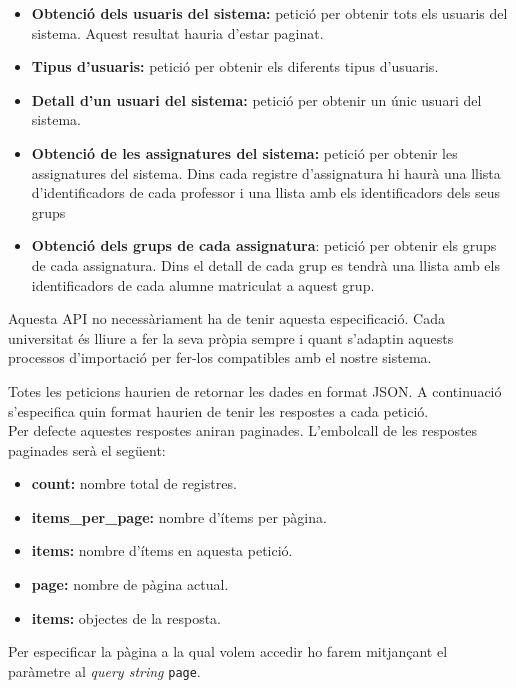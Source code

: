 	\begin{itemize} 
		\item \textbf{Obtenció dels usuaris del sistema:} petició per obtenir tots els usuaris del sistema. Aquest resultat hauria d'estar paginat.
		\item \textbf{Tipus d'usuaris:} petició per obtenir els diferents tipus d'usuaris.
		\item \textbf{Detall d'un usuari del sistema:} petició per obtenir un únic usuari del sistema.
		\item \textbf{Obtenció de les assignatures del sistema:} petició per obtenir les assignatures del sistema. Dins cada registre d'assignatura hi haurà una llista d'identificadors de cada professor i una llista amb els identificadors dels seus grups
		
		\item \textbf{Obtenció dels grups de cada assignatura}: petició per obtenir els grups de cada assignatura. Dins el detall de cada grup es tendrà una llista amb els identificadors de cada alumne matriculat a aquest grup.
		
	\end{itemize}
	
Aquesta \ac{API} no necessàriament ha de tenir aquesta especificació. Cada universitat és lliure a fer la seva pròpia sempre i quant s'adaptin aquests processos d'importació per fer-los compatibles amb el nostre sistema.
	
Totes les peticions haurien de retornar les dades en format \ac{JSON}. A continuació s'especifica quin format haurien de tenir les respostes a cada petició.\\

Per defecte aquestes respostes aniran paginades. L'embolcall de les respostes paginades serà el següent:

\begin{itemize}
	\item \textbf{count:} nombre total de registres.
	\item \textbf{items\_per\_page:} nombre d'ítems per pàgina.
	\item \textbf{items:} nombre d'ítems en aquesta petició.
	\item \textbf{page:} nombre de pàgina actual.
	\item \textbf{items:} objectes de la resposta.
\end{itemize}

Per especificar la pàgina a la qual volem accedir ho farem mitjançant el paràmetre al \emph{query string} \texttt{page}.

